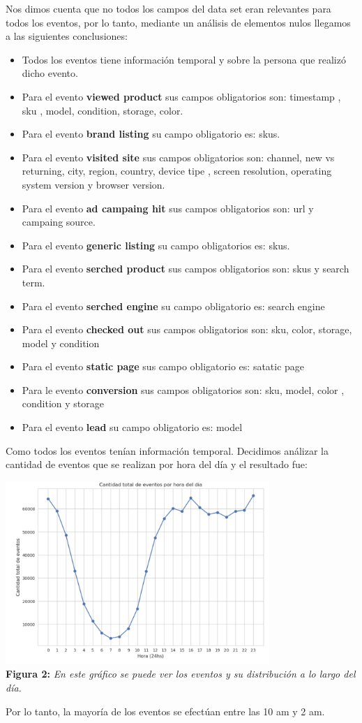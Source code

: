 \documentclass[titlepage,a4paper]{article}
\begin{document}
	Nos dimos cuenta que no todos los campos del data set eran relevantes para todos los eventos, por lo tanto, mediante un análisis de elementos nulos llegamos a las siguientes conclusiones: 
	\begin{itemize}
		\item Todos los eventos tiene información temporal y sobre la persona que realizó dicho evento. 
		\item Para el evento \textbf{viewed product} sus campos obligatorios son: timestamp , sku , model, condition, storage, color.
		\item Para el evento \textbf{brand listing} su campo obligatorio es: skus. 
		\item Para el evento \textbf{visited site} sus campos obligatorios son: channel, new vs returning, city, region, country, device tipe , screen resolution, operating system version y browser version.
		\item Para el evento \textbf{ad campaing hit} sus campos obligatorios son: url  y campaing source.
		\item Para el evento \textbf{generic listing} su campo obligatorios es: skus.
		\item Para el evento  \textbf{serched product } sus campos obligatorios son: skus y search term.
		\item Para el evento \textbf{serched engine} su campo obligatorio es: search engine
		\item Para el evento \textbf{checked out}  sus campos obligatorios son: sku, color, storage, model y condition 
		\item Para el evento \textbf{static page}  sus campo obligatorio es: satatic page
		\item Para le evento \textbf{conversion} sus campos obligatorios son:  sku, model, color , condition y storage
		\item Para el evento \textbf{lead} su campo obligatorio es: model

	\end{itemize}	
	
	Como todos los eventos tenían información temporal. Decidimos análizar la cantidad de eventos que se realizan por hora del día y el resultado fue:
	\begin{center}
	\includegraphics[width=10cm]{cantidadDeEventosPorHoraDelDia.jpg}\\
	\textbf{Figura 2:}  \textit{En este gráfico se puede ver los eventos y su distribución a lo largo del día. }
	\end{center}
	Por lo tanto, la mayoría de los eventos se efectúan entre las 10 am y 2 am. 
	
\end{document}
